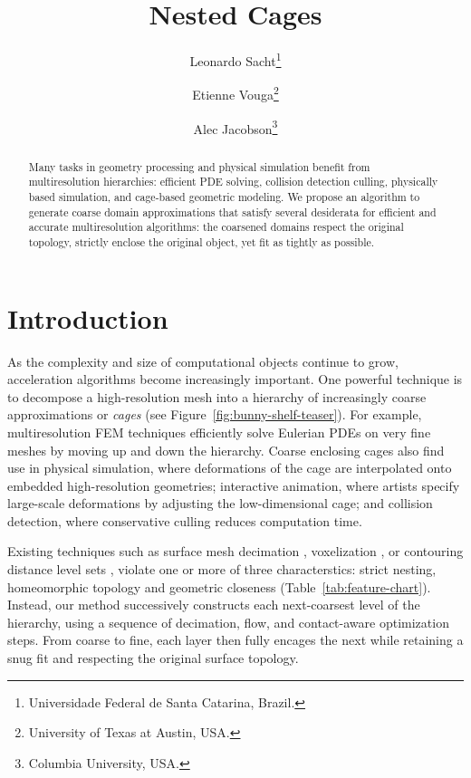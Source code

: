 \documentclass{cgyrf15}
\title{Nested Cages}
\author{
Leonardo Sacht\thanks{Universidade Federal de Santa Catarina, Brazil.} \and
Etienne Vouga\thanks{University of Texas at Austin, USA.} \and
Alec Jacobson\thanks{Columbia University, USA.}
}
\begin{document}
\renewcommand{\baselinestretch}{0.95}

\maketitle

\begin{abstract}
Many tasks in geometry processing and physical simulation benefit from
multiresolution hierarchies: efficient PDE solving, collision detection
culling, physically based simulation, and cage-based geometric modeling. We
propose an algorithm to generate coarse domain approximations that satisfy
several desiderata for efficient and accurate multiresolution algorithms: the
coarsened domains respect the original topology, strictly enclose the original
object, yet fit as tightly as possible.
\end{abstract}

\section{Introduction}

As the complexity and size of computational objects continue to grow,
acceleration algorithms become increasingly important. One powerful technique
is to decompose a high-resolution mesh into a hierarchy of increasingly coarse
approximations or \emph{cages} (see Figure~\ref{fig:bunny-shelf-teaser}). For example,
multiresolution FEM techniques efficiently solve Eulerian PDEs on very fine
meshes by moving up and down the hierarchy.  Coarse enclosing cages also find
use in physical simulation, where deformations of the cage are interpolated
onto embedded high-resolution geometries; interactive animation, where
artists specify large-scale deformations by adjusting the low-dimensional cage;
and collision detection, where conservative culling reduces computation
time. 

Existing techniques such as surface mesh decimation \cite{Hoppe:1996:PM}, 
voxelization \cite{Xian:2009}, or
contouring distance level sets \cite{Shen:2004:IAI}, violate one or more of three characterstics:
strict nesting, homeomorphic topology and geometric closeness
(Table~\ref{tab:feature-chart}).  Instead, our method successively constructs
each next-coarsest level of the hierarchy, using a sequence of decimation,
flow, and contact-aware optimization steps.  From coarse to fine, each layer
then fully encages the next while retaining a snug fit and respecting the
original surface topology.
\end{document}
